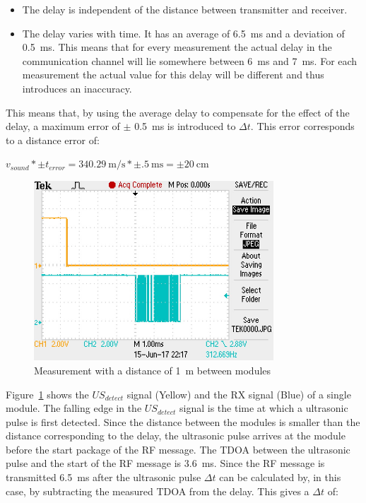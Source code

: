 \begin{itemize}
\item
The delay is independent of the distance between transmitter and receiver.
\item
The delay varies with time.
It has an average of \SI{6.5}{\milli\second} and a deviation of \SI{0.5}{\milli\second}.
This means that for every measurement the actual delay in the communication channel will lie somewhere between \SI{6}{\milli\second} and \SI{7}{\milli\second}.
For each measurement the actual value for this delay will be different and thus introduces an inaccuracy.
\end{itemize}

This means that, by using the average delay to compensate for the effect of the delay, a maximum error of $\pm$ \SI{0.5}{\milli\second} is introduced to $\Delta t$.
This error corresponds to a distance error of:

$ v_{sound} * \pm t_{error} = \SI{340.29}{\meter\per\second} * \pm \SI{.5}{\milli\second} =\pm \SI{20}{\centi\meter} $


\begin{figure}[H]
\centering
\includegraphics[width=0.8\textwidth]{Figures/test_1m.JPG}
\caption{Measurement with a distance of \SI{1}{\meter} between modules}
\label{fig:mes_1}
\end{figure}

Figure~\ref{fig:mes_1} shows the $US_{detect}$ signal (Yellow) and the RX signal (Blue) of a single module.
The falling edge in the $US_{detect}$ signal is the time at which a ultrasonic pulse is first detected.
Since the distance between the modules is smaller than the distance corresponding to the delay, the ultrasonic pulse arrives at the module before the start package of the RF message.
The TDOA between the ultrasonic pulse and the start of the RF message is \SI{3.6}{\milli\second}.
Since the RF message is transmitted \SI{6.5}{\milli\second} after the ultrasonic pulse $\Delta t$ can be calculated by, in this case, by subtracting the measured TDOA from the delay.
This gives a $\Delta t$ of:


